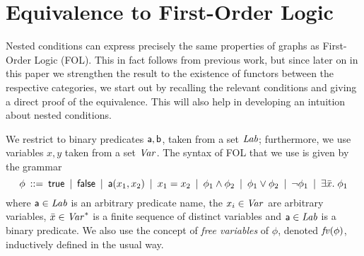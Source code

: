 \section{Equivalence to First-Order Logic}

Nested conditions can express precisely the same properties of graphs as First-Order Logic (FOL). This in fact follows from previous work, but since later on in this paper we strengthen the result to the existence of functors between the respective categories, we start out by recalling the relevant conditions and giving a direct proof of the equivalence. This will also help in developing an intuition about nested conditions.

We restrict to binary predicates $\mathsf{a},\mathsf{b}$, taken from a set $\mathit{Lab}$; furthermore, we use variables $x,y$ taken from a set $\mathit{Var}$. The syntax of FOL that we use is given by the grammar
%
\[ \phi \:::=\: \mathsf{true}
        \:\mid\: \mathsf{false}
		\:\mid\: \mathsf{a}(x_1,x_2)
        \:\mid\: x_1=x_2
		\:\mid\: \phi_1\wedge \phi_2
		\:\mid\: \phi_1\vee \phi_2
		\:\mid\: \neg\phi_1
		\:\mid\: \exists \bar x.\; \phi_1 
		\]
where $\mathsf{a}\in\mathit{Lab}$ is an arbitrary predicate name, the $x_i\in\mathit{Var}$ are arbitrary variables, $\bar x\in \mathit{Var}^*$ is a finite sequence of distinct variables and $\mathsf{a} \in \mathit{Lab}$ is a binary predicate. We also use the concept of \emph{free variables} of $\phi$, denoted $\mathit{fv}(\phi)$, inductively defined in the usual way.

